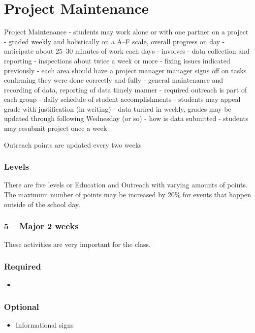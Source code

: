 \documentclass[letterpaper,10pt]{memoir}
\begin{document}
	\vspace*{1cm}


	
\newpage
\section*{Project Maintenance}

Project Maintenance
- students may work alone or with one partner on a project
- graded weekly and holistically on a A--F scale, overall progress on day
- anticipate about 25--30 minutes of work each days
- involves
	-	data collection and reporting
	-	inspections about twice a week or more
	-	fixing issues indicated previously
	-	each area should have a project manager
			manager signs off on tasks confirming they were done correctly and fully
	-	general maintenance and recording of data, reporting of data timely manner
	-	required outreach is part of each group
	-	daily schedule of student accomplishments
	-	students may appeal grade with justification (in writing)
	-	data turned in weekly, grades may be updated through following Wednesday (or so)
	-	how is data submitted
	-	students may resubmit project once a week


\newpage
Outreach points are updated every two weeks

\subsubsection*{Levels}
There are five levels or Education and Outreach with varying amounts of points. The maximum number
of points may be increased by 20\% for events that happen outside of the school day.

\subsubsection*{5 -- Major \hfill 2 weeks}
These activities are very important for the class. 



\subsubsection*{Required}
\begin{itemize}[nosep]
\item 
\end{itemize}

\subsubsection*{Optional}
\begin{itemize}[nosep]
\item Informational signs
\end{itemize}
\end{document}
